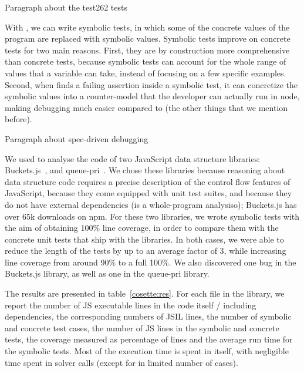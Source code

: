 
Paragraph about the test262 tests

With \cosette, we can write symbolic tests, in which some of the concrete values of the program are replaced with symbolic values.
Symbolic tests improve on concrete tests for two main reasons.
First, they are by construction more comprehensive than concrete tests, because symbolic tests can account for the whole range of values that a variable can take, instead of focusing on a few specific examples.
Second, when \cosette finds a failing assertion inside a symbolic test, it can concretize the symbolic values into a counter-model that the developer can actually run in node, making debugging much easier compared to (the other things that we mention before).

Paragraph about spec-driven debugging

We used \cosette to analyse the code of two JavaScript data structure libraries: Buckets.js~\cite{buckets}, and queue-pri~\cite{priq}.
We chose these libraries because reasoning about data structure code requires a precise description of the control flow features of JavaScript, because they come equipped with unit test suites, and because they do not have external dependencies (\cosette is a whole-program analysiso); Buckets.js has over 65k downloads on npm.
For these two libraries, we wrote symbolic tests with the aim of obtaining 100\% line coverage, in order to compare them with the concrete unit tests that ship with the libraries.
In both cases, we were able to reduce the length of the tests by up to an average factor of 3, while increasing line coverage from around 90\% to a full 100\%.
We also discovered one bug in the Buckets.js library, as well as one in the queue-pri library.


The results are presented in table~\ref{cosette:res}.
For each file in the library, we report the number of JS executable lines in the code itself / including dependencies, the corresponding numbers of JSIL lines, the number of symbolic and concrete test cases, the number of JS lines in the symbolic and concrete tests, the coverage measured as percentage of lines and the average \cosette run time for the symbolic tests.
Most of the execution time is spent in \cosette itself, with negligible time spent in solver calls (except for in limited number of cases).



